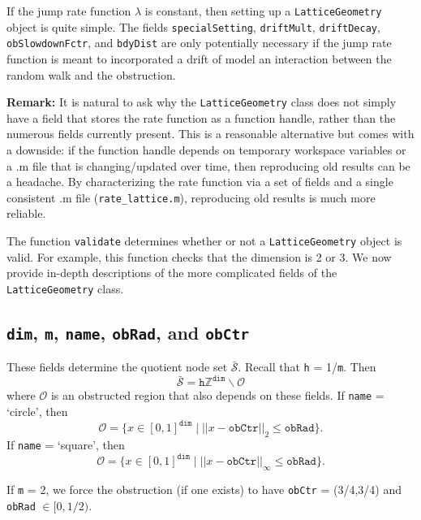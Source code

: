 \documentclass[11pt, oneside]{article}   	%
\theoremstyle{definition}
\newcommand\sS{\mathcal{S}}
\newcommand{\integ}{{\mathbb Z}}
\newcommand\oS{\bar{\sS}}
\begin{document}
If the jump rate function $\lambda$ is constant, then setting up a \texttt{LatticeGeometry} object is quite simple. The fields \texttt{specialSetting}, \texttt{driftMult}, \texttt{driftDecay}, \texttt{obSlowdownFctr}, and \texttt{bdyDist} are only potentially necessary if the jump rate function is meant to incorporated a drift of model an interaction between the random walk and the obstruction.

{\bf Remark:} It is natural to ask why the \texttt{LatticeGeometry} class does not simply have a field that stores the rate function as a function handle, rather than the numerous fields currently present. This is a reasonable alternative but comes with a downside: if the function handle depends on temporary workspace variables or a .m file that is changing/updated over time, then reproducing old results can be a headache. By characterizing the rate function via a set of fields and a single consistent .m file (\texttt{rate\_lattice.m}), reproducing old results is much more reliable.

The function \texttt{validate} determines whether or not a \texttt{LatticeGeometry} object is valid. For example, this function checks that the dimension is 2 or 3. We now provide in-depth descriptions of the more complicated fields of the \texttt{LatticeGeometry} class.

\subsection{\texttt{dim}, \texttt{m}, \texttt{name}, \texttt{obRad}, and \texttt{obCtr}}
These fields determine the quotient node set $\oS$. Recall that \texttt{h} = 1/\texttt{m}. Then
\begin{equation}
\oS = \texttt{h} \integ^{\texttt{dim}} \backslash \mathcal{O}
\end{equation}
where $\mathcal{O}$ is an obstructed region that also depends on these fields. If \texttt{name} = `circle', then
\begin{equation*}
\mathcal{O} = \{x \in [0,1]^{\texttt{dim}} \;|\; ||x - \texttt{obCtr}||_2 \leq \texttt{obRad}\}.
\end{equation*}
If \texttt{name} = `square', then
\begin{equation*}
\mathcal{O} = \{x \in [0,1]^{\texttt{dim}} \;|\; ||x - \texttt{obCtr}||_{\infty} \leq \texttt{obRad}\}.
\end{equation*}

If \texttt{m} = 2, we force the obstruction (if one exists) to have \texttt{obCtr} = (3/4,3/4) and \texttt{obRad} $\in [0,1/2)$.
\end{document}
